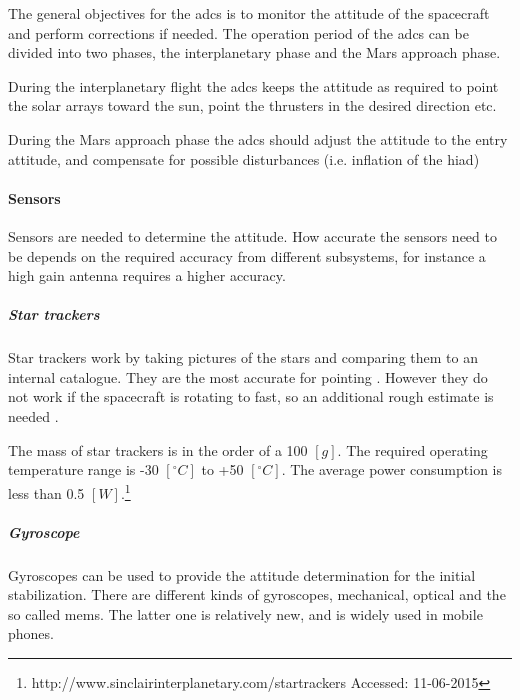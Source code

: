 The general objectives for the \gls{adcs} is to monitor the attitude of the spacecraft and perform corrections if needed. The operation period of the \gls{adcs} can be divided into two phases, the interplanetary phase and the Mars approach phase.

During the interplanetary flight the \gls{adcs} keeps the attitude as required to point the solar arrays toward the sun, point the thrusters in the desired direction etc.

During the Mars approach phase the \gls{adcs} should adjust the attitude to the entry attitude, and compensate for possible disturbances (i.e. inflation of the \gls{hiad})



\paragraph{Sensors} Sensors are needed to determine the attitude. How accurate the sensors need to be depends on the required accuracy from different subsystems, for instance a high gain antenna requires a higher accuracy. 

\subparagraph{Star trackers}
Star trackers work by taking pictures of the stars and comparing them to an internal catalogue. They are the most accurate for pointing \cite{CarlChristianLiebe1995}. However they do not work if the spacecraft is rotating to fast, so an additional rough estimate is needed \cite[p. 584]{Wertz2011}. 

The mass of star trackers is in the order of a 100 $\left[g\right]$. The required operating temperature range is -30 $\left[^\circ C\right]$ to +50 $\left[^\circ C\right]$. The average power consumption is less than 0.5 $\left[W\right]$.\footnote{\label{ftn:star_tracker}http://www.sinclairinterplanetary.com/startrackers Accessed: 11-06-2015}

\subparagraph{Gyroscope}
                        
Gyroscopes can be used to provide the attitude determination for the initial stabilization. There are different kinds of gyroscopes, mechanical, optical and the so called \gls{mems}. The latter one is relatively new, and is widely used in mobile phones. 


